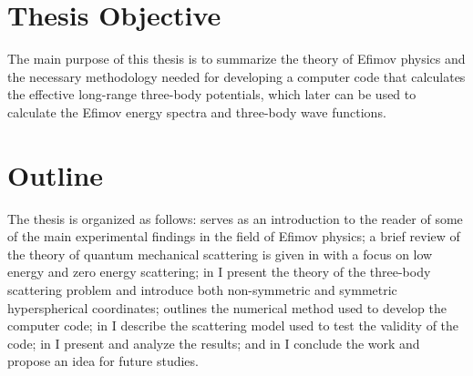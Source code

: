 \section{Thesis Objective}
The main purpose of this thesis is to summarize the theory of Efimov physics and the necessary methodology needed for developing a computer code that calculates the effective long-range three-body potentials, which later can be used to calculate the Efimov energy spectra and three-body wave functions. 

\section{Outline}
The thesis is organized as follows:  serves as an introduction to the reader of some of the main experimental findings in the field of Efimov physics; a brief review of the theory of quantum mechanical scattering is given in  with a focus on low energy and zero energy scattering; in  I present the theory of the three-body scattering problem and introduce both non-symmetric and symmetric hyperspherical coordinates;  outlines the numerical method used to develop the computer code; in  I describe the scattering model used to test the validity of the code; in  I present and analyze the results; and in  I conclude the work and propose an idea for future studies.
